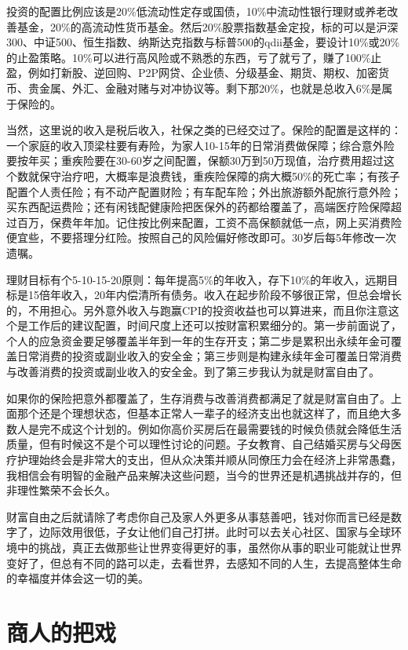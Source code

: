 \documentclass[
  letterpaper,
  DIV=11,
  numbers=noendperiod]{scrreprt}
\begin{document}
投资的配置比例应该是20\%低流动性定存或国债，10\%中流动性银行理财或养老改善基金，20\%的高流动性货币基金。然后20\%股票指数基金定投，标的可以是沪深300、中证500、恒生指数、纳斯达克指数与标普500的qdii基金，要设计10\%或20\%的止盈策略。10\%可以进行高风险或不熟悉的东西，亏了就亏了，赚了100\%止盈，例如打新股、逆回购、P2P网贷、企业债、分级基金、期货、期权、加密货币、贵金属、外汇、金融对赌与对冲协议等。剩下那20\%，也就是总收入6\%是属于保险的。

当然，这里说的收入是税后收入，社保之类的已经交过了。保险的配置是这样的：一个家庭的收入顶梁柱要有寿险，为家人10-15年的日常消费做保障；综合意外险要按年买；重疾险要在30-60岁之间配置，保额30万到50万现值，治疗费用超过这个数就保守治疗吧，大概率是浪费钱，重疾险保障的病大概50\%的死亡率；有孩子配置个人责任险；有不动产配置财险；有车配车险；外出旅游额外配旅行意外险；买东西配运费险；还有闲钱配健康险把医保外的药都给覆盖了，高端医疗险保障超过百万，保费年年加。记住按比例来配置，工资不高保额就低一点，网上买消费险便宜些，不要搭理分红险。按照自己的风险偏好修改即可。30岁后每5年修改一次遗嘱。

理财目标有个5-10-15-20原则：每年提高5\%的年收入，存下10\%的年收入，远期目标是15倍年收入，20年内偿清所有债务。收入在起步阶段不够很正常，但总会增长的，不用担心。另外意外收入与跑赢CPI的投资收益也可以算进来，而且你注意这个是工作后的建议配置，时间尺度上还可以按财富积累细分的。第一步前面说了，个人的应急资金要足够覆盖半年到一年的生存开支；第二步是累积出永续年金可覆盖日常消费的投资或副业收入的安全金；第三步则是构建永续年金可覆盖日常消费与改善消费的投资或副业收入的安全金。到了第三步我认为就是财富自由了。

如果你的保险把意外都覆盖了，生存消费与改善消费都满足了就是财富自由了。上面那个还是个理想状态，但基本正常人一辈子的经济支出也就这样了，而且绝大多数人是完不成这个计划的。例如你高价买房后在最需要钱的时候负债就会降低生活质量，但有时候这不是个可以理性讨论的问题。子女教育、自己结婚买房与父母医疗护理始终会是非常大的支出，但从众决策并顺从同僚压力会在经济上非常愚蠢，我相信会有明智的金融产品来解决这些问题，当今的世界还是机遇挑战并存的，但非理性繁荣不会长久。

财富自由之后就请除了考虑你自己及家人外更多从事慈善吧，钱对你而言已经是数字了，边际效用很低，子女让他们自己打拼。此时可以去关心社区、国家与全球环境中的挑战，真正去做那些让世界变得更好的事，虽然你从事的职业可能就让世界变好了，但总有不同的路可以走，去看世界，去感知不同的人生，去提高整体生命的幸福度并体会这一切的美。

\section{商人的把戏}\label{ux5546ux4ebaux7684ux628aux620f}
\end{document}
